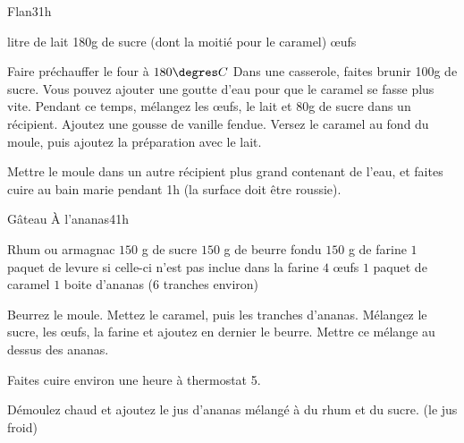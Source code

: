 \begin{recette}{Flan}{3}{}{1h}
\begin{ingredients}
 litre de lait
\ingredient 180g de sucre (dont la moitié pour le caramel)
 œufs
\end{ingredients}

\begin{preparation}
\etape Faire préchauffer le four à $180\degres C$
\etape Dans une casserole, faites brunir 100g de sucre. Vous pouvez ajouter une goutte d'eau pour que le caramel se fasse plus vite.
\etape Pendant ce temps, mélangez les œufs, le lait et 80g de sucre dans un récipient. Ajoutez une gousse de vanille fendue.
\etape Versez le caramel au fond du moule, puis ajoutez la préparation avec le lait.
\end{preparation}

\begin{cuisson}
Mettre le moule dans un autre récipient plus grand contenant de l'eau, et faites cuire au bain marie pendant 1h (la surface doit être roussie).
\end{cuisson}
\end{recette}

\begin{recette}{Gâteau À l'ananas}{4}{}{1h}
\begin{ingredients}
\ingredient Rhum ou armagnac
\ingredient $150$ g de sucre
\ingredient $150$ g de beurre fondu
\ingredient $150$ g de farine
\ingredient $1$ paquet de levure si celle-ci n'est pas inclue dans la farine
\ingredient $4$ œufs
\ingredient $1$ paquet de caramel
\ingredient $1$ boite d'ananas ($6$ tranches environ)
\end{ingredients}

\begin{preparation}
\etape Beurrez le moule. Mettez le caramel, puis les tranches d'ananas.
\etape Mélangez le sucre, les œufs, la farine et ajoutez en dernier le beurre.
\etape Mettre ce mélange au dessus des ananas.
\end{preparation}

\begin{cuisson}
Faites cuire environ une heure à thermostat 5.

Démoulez chaud et ajoutez le jus d'ananas mélangé à du rhum et du sucre. (le jus froid)
\end{cuisson}

\end{recette}

